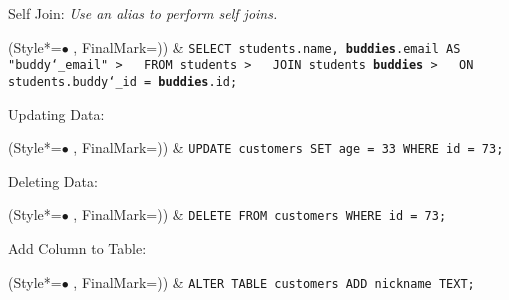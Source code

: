 \vspace{\baselineskip}
Self Join:\newline
\textit{Use an alias to perform self joins.}
\begin{easylist}[itemize]
\ListProperties(Style*=$\bullet$ , FinalMark={)})
& \texttt{SELECT students.name, \textbf{buddies}.email AS "buddy\char`_email"\newline
>~~~FROM students\newline
>~~~JOIN students \textbf{buddies}\newline
>~~~ON students.buddy\char`_id = \textbf{buddies}.id;}
\end{easylist}

\newpage
Updating Data:
\begin{easylist}[itemize]
\ListProperties(Style*=$\bullet$ , FinalMark={)})
& \texttt{UPDATE customers SET age = 33 WHERE id = 73;}
\end{easylist}

\vspace{\baselineskip}
Deleting Data:
\begin{easylist}[itemize]
\ListProperties(Style*=$\bullet$ , FinalMark={)})
& \texttt{DELETE FROM customers WHERE id = 73;}
\end{easylist}

\vspace{\baselineskip}
Add Column to Table:
\begin{easylist}[itemize]
\ListProperties(Style*=$\bullet$ , FinalMark={)})
& \texttt{ALTER TABLE customers ADD nickname TEXT;}
\end{easylist}

\newpage